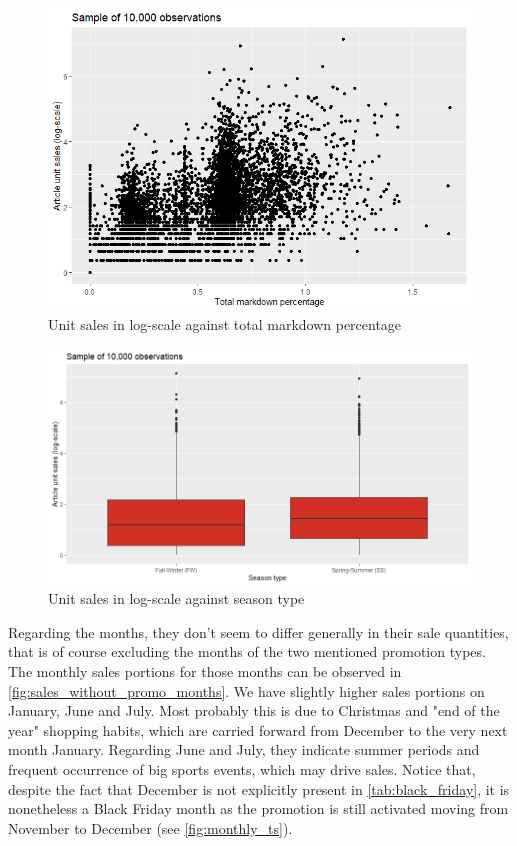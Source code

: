  \begin{figure}[H]
\centering
  \includegraphics[width=0.65\linewidth]{figures/markdown_against_logsales.png}
  \caption{Unit sales in log-scale against total markdown percentage}
  \label{fig:markdown_against_logsales}
\end{figure}



 \begin{figure}[H]
\centering
  \includegraphics[width=0.65\linewidth]{figures/season_type_against_logsales.png}
  \caption{Unit sales in log-scale against season type}
  \label{fig:season_type_against_logsales}
\end{figure}





Regarding the months, they don't seem to differ generally in their sale quantities, that is of course excluding the months of the two mentioned promotion types. The monthly sales portions for those months can be observed in \autoref{fig:sales_without_promo_months}. We have slightly higher sales portions on January, June and July. 
Most probably this is due to Christmas and "end of the year" shopping habits, which are carried forward from December to the very next month January. 
Regarding June and July, they indicate summer periods and frequent occurrence of big sports events, which may drive sales. 
Notice that, despite the fact that December is not explicitly present in \autoref{tab:black_friday}, it is nonetheless a Black Friday month as the promotion is still activated moving from November to December (see \autoref{fig:monthly_ts}). \\


